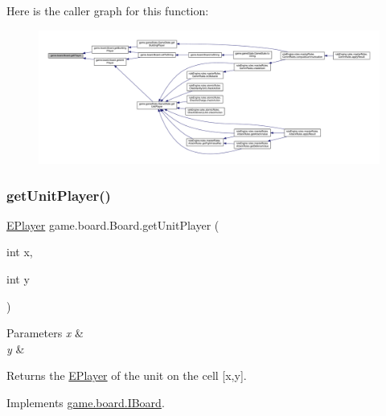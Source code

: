 Here is the caller graph for this function\+:
\nopagebreak
\begin{figure}[H]
\begin{center}
\leavevmode
\includegraphics[width=350pt]{classgame_1_1board_1_1_board_ae5b7778e3e77c51eb44064d3a4521d71_icgraph}
\end{center}
\end{figure}
\mbox{\label{classgame_1_1board_1_1_board_a4290038dfff8b88ab1e95a96f5d083b9}} 
\subsubsection{\texorpdfstring{get\+Unit\+Player()}{getUnitPlayer()}}
{\footnotesize\ttfamily \mbox{\hyperlink{enumgame_1_1_e_player}{E\+Player}} game.\+board.\+Board.\+get\+Unit\+Player (\begin{DoxyParamCaption}\item[{int}]{x,  }\item[{int}]{y }\end{DoxyParamCaption})\hspace{0.3cm}{\ttfamily [inline]}}


\begin{DoxyParams}{Parameters}
{\em x} & \\
\hline
{\em y} & \\
\hline
\end{DoxyParams}
\begin{DoxyReturn}{Returns}
the \mbox{\hyperlink{enumgame_1_1_e_player}{E\+Player}} of the unit on the cell \mbox{[}x,y\mbox{]}. 
\end{DoxyReturn}


Implements \mbox{\hyperlink{interfacegame_1_1board_1_1_i_board_a5f4d593eb6fcd82b36ddd8f629ceee03}{game.\+board.\+I\+Board}}.


